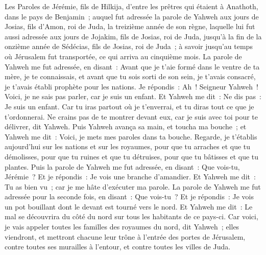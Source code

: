 \begin{multicols}{2}
\VerseOne{}Les Paroles de Jérémie, fils de Hilkija, d'entre les prêtres qui étaient à Anathoth, dans le pays de Benjamin~;
auquel fut adressée la parole de Yahweh aux jours de Josias, fils d'Amon, roi de Juda, la treizième année de son règne,
laquelle lui fut aussi adressée aux jours de Jojakim, fils de Josias, roi de Juda, jusqu'à la fin de la onzième année de Sédécias, fils de Josias, roi de Juda~; à savoir jusqu'au temps où Jérusalem fut transportée, ce qui arriva au cinquième mois.
La parole de Yahweh me fut adressée, en disant~:
Avant que je t'aie formé dans le ventre de ta mère, je te connaissais, et avant que tu sois sorti de son sein, je t'avais consacré, je t'avais établi prophète pour les nations.
Je répondis~: Ah~! Seigneur Yahweh~! Voici, je ne sais pas parler, car je suis un enfant.
Et Yahweh me dit~: Ne dis pas~: Je suis un enfant. Car tu iras partout où je t'enverrai, et tu diras tout ce que je t'ordonnerai.
Ne crains pas de te montrer devant eux, car je suis avec toi pour te délivrer, dit Yahweh.
Puis Yahweh avança sa main, et toucha ma bouche~; et Yahweh me dit~: Voici, je mets mes paroles dans ta bouche.
Regarde, je t'établis aujourd'hui sur les nations et sur les royaumes, pour que tu arraches et que tu démolisses, pour que tu ruines et que tu détruises, pour que tu bâtisses et que tu plantes.
Puis la parole de Yahweh me fut adressée, en disant~: Que vois-tu, Jérémie~? Et je répondis~: Je vois une branche d'amandier.
Et Yahweh me dit~: Tu as bien vu~; car je me hâte d'exécuter ma parole.
La parole de Yahweh me fut adressée pour la seconde fois, en disant~: Que vois-tu~? Et je répondis~: Je vois un pot bouillant dont le devant est tourné vers le nord.
Et Yahweh me dit~: Le mal se découvrira du côté du nord sur tous les habitants de ce pays-ci.
Car voici, je vais appeler toutes les familles des royaumes du nord, dit Yahweh~; elles viendront, et mettront chacune leur trône à l'entrée des portes de Jérusalem, contre toutes ses murailles à l'entour, et contre toutes les villes de Juda.

\end{multicols}
